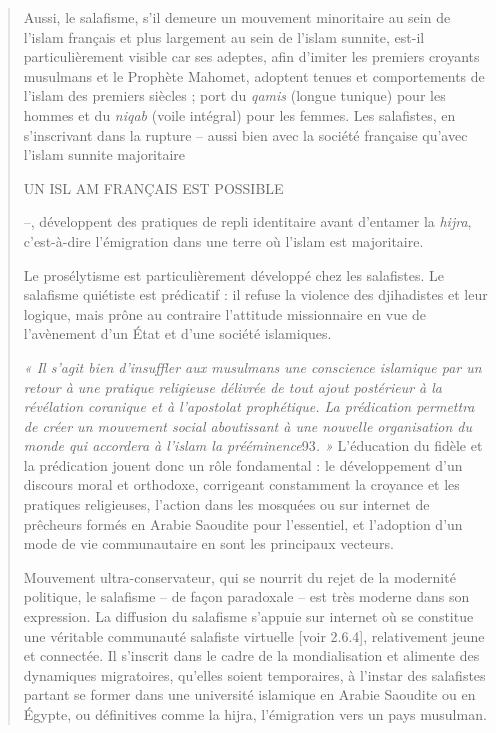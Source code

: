 \begin{quote}
Aussi, le salafisme, s'il demeure un mouvement minoritaire au sein de
l'islam français et plus largement au sein de l'islam sunnite, est-il
particulièrement visible car ses adeptes, afin d'imiter les premiers
croyants musulmans et le Prophète Mahomet, adoptent tenues et
comportements de l'islam des premiers siècles ; port du \emph{qamis}
(longue tunique) pour les hommes et du \emph{niqab} (voile intégral)
pour les femmes. Les salafistes, en s'inscrivant dans la rupture --
aussi bien avec la société française qu'avec l'islam sunnite majoritaire

UN ISL AM FRANÇAIS EST POSSIBLE

--, développent des pratiques de repli identitaire avant d'entamer la
\emph{hijra}, c'est-à-dire l'émigration dans une terre où l'islam est
majoritaire.

Le prosélytisme est particulièrement développé chez les salafistes. Le
salafisme quiétiste est prédicatif : il refuse la violence des
djihadistes et leur logique, mais prône au contraire l'attitude
missionnaire en vue de l'avènement d'un État et d'une société
islamiques.

\emph{« Il s'agit bien d'insuffler aux musulmans une conscience
islamique par un retour à une pratique religieuse délivrée de tout ajout
postérieur à la révélation coranique et à l'apostolat prophétique. La
prédication permettra de créer un mouvement social aboutissant à une
nouvelle organisation du monde qui accordera à l'islam la
prééminence}93\emph{. »} L'éducation du fidèle et la prédication jouent
donc un rôle fondamental : le développement d'un discours moral et
orthodoxe, corrigeant constamment la croyance et les pratiques
religieuses, l'action dans les mosquées ou sur internet de prêcheurs
formés en Arabie Saoudite pour l'essentiel, et l'adoption d'un mode de
vie communautaire en sont les principaux vecteurs.

Mouvement ultra-conservateur, qui se nourrit du rejet de la modernité
politique, le salafisme -- de façon paradoxale -- est très moderne dans
son expression. La diffusion du salafisme s'appuie sur internet où se
constitue une véritable communauté salafiste virtuelle {[}voir 2.6.4{]},
relativement jeune et connectée. Il s'inscrit dans le cadre de la
mondialisation et alimente des dynamiques migratoires, qu'elles soient
temporaires, à l'instar des salafistes partant se former dans une
université islamique en Arabie Saoudite ou en Égypte, ou définitives
comme la hijra, l'émigration vers un pays musulman.
\end{quote}

